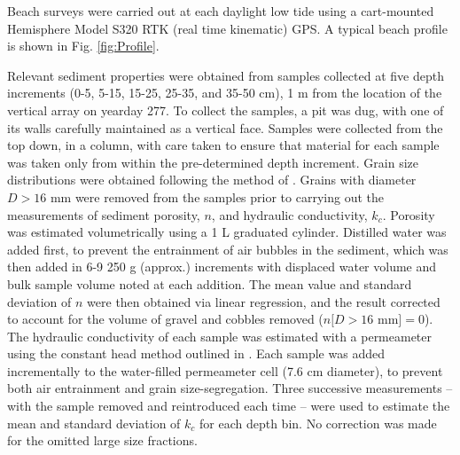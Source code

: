 Beach surveys were carried out at each daylight low tide using a cart-mounted Hemisphere Model S320 RTK (real time kinematic) GPS. A typical beach profile is shown in Fig. \ref{fig:Profile}.

Relevant sediment properties were obtained from samples collected at five depth increments (0-5, 5-15, 15-25, 25-35, and 35-50 cm), 1 m from the location of the vertical array on yearday 277. To collect the samples, a pit was dug, with one of its walls carefully maintained as a vertical face. Samples were collected from the top down, in a column, with care taken to ensure that material for each sample was taken only from within the pre-determined depth increment. Grain size distributions were obtained following the method of \citet{Ingram1971}. Grains with diameter $D > 16$ mm were removed from the samples prior to carrying out the measurements of sediment porosity, $n$, and hydraulic conductivity, $k_{c}$. Porosity was estimated volumetrically using a 1 L graduated cylinder. Distilled water was added first, to prevent the entrainment of air bubbles in the sediment, which was then added in 6-9 250 g (approx.) increments with displaced water volume and bulk sample volume noted at each addition. The mean value and standard deviation of $n$ were then obtained via linear regression, and the result corrected to account for the volume of gravel and cobbles removed ($n[D>16$ mm$] = 0$). The hydraulic conductivity of each sample was estimated with a permeameter using the constant head method outlined in \citet{Craig1974}. Each sample was added incrementally to the water-filled permeameter cell (7.6 cm diameter), to prevent both air entrainment and grain size-segregation. Three successive measurements -- with the sample removed and reintroduced each time -- were used to estimate the mean and standard deviation of $k_{c}$ for each depth bin. No correction was made for the omitted large size fractions.

